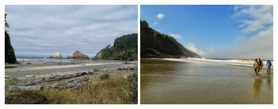 \documentclass{article}
\begin{document}
\begin{itemize}
  \begin{center}
    \includegraphics[width=0.45\textwidth]{2013-07-28-11-09-04.jpg}
    \includegraphics[width=0.45\textwidth]{2013-07-28-11-22-00.jpg}
  \end{center}
\end{itemize}

\clearpage
\end{document}
